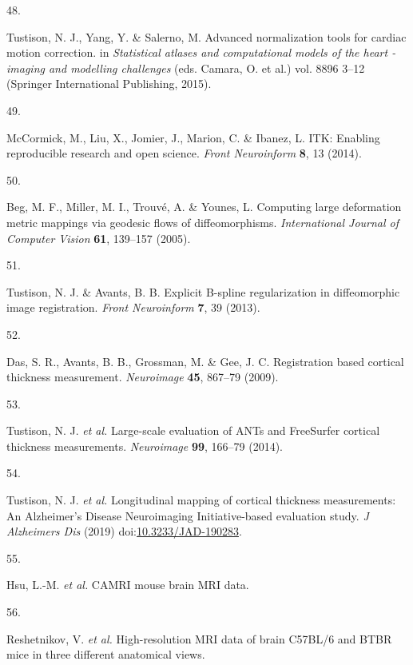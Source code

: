\documentclass[
  12pt,
]{article}
\newlength{\cslhangindent}
\newlength{\csllabelwidth}
\newenvironment{CSLReferences}[2] %
 {%
  \setlength{\parindent}{0pt}
  \ifodd #1 \everypar{\setlength{\hangindent}{\cslhangindent}}\ignorespaces\fi
  \ifnum #2 > 0
  \setlength{\parskip}{#2\baselineskip}
  \fi
 }%
 {}
\newcommand{\CSLLeftMargin}[1]{\parbox[t]{\csllabelwidth}{#1}}
\newcommand{\CSLRightInline}[1]{\parbox[t]{\linewidth - \csllabelwidth}{#1}\break}
\begin{document}
\begin{CSLReferences}{0}{0}
\leavevmode{}%
\CSLLeftMargin{48. }
\CSLRightInline{Tustison, N. J., Yang, Y. \& Salerno, M. Advanced
normalization tools for cardiac motion correction. in \emph{Statistical
atlases and computational models of the heart - imaging and modelling
challenges} (eds. Camara, O. et al.) vol. 8896 3--12 (Springer
International Publishing, 2015).}

\leavevmode{}%
\CSLLeftMargin{49. }
\CSLRightInline{McCormick, M., Liu, X., Jomier, J., Marion, C. \&
Ibanez, L. ITK: Enabling reproducible research and open science.
\emph{Front Neuroinform} \textbf{8}, 13 (2014).}

\leavevmode{}%
\CSLLeftMargin{50. }
\CSLRightInline{Beg, M. F., Miller, M. I., Trouvé, A. \& Younes, L.
Computing large deformation metric mappings via geodesic flows of
diffeomorphisms. \emph{International Journal of Computer Vision}
\textbf{61}, 139--157 (2005).}

\leavevmode{}%
\CSLLeftMargin{51. }
\CSLRightInline{Tustison, N. J. \& Avants, B. B. Explicit {B}-spline
regularization in diffeomorphic image registration. \emph{Front
Neuroinform} \textbf{7}, 39 (2013).}

\leavevmode{}%
\CSLLeftMargin{52. }
\CSLRightInline{Das, S. R., Avants, B. B., Grossman, M. \& Gee, J. C.
Registration based cortical thickness measurement. \emph{Neuroimage}
\textbf{45}, 867--79 (2009).}

\leavevmode{}%
\CSLLeftMargin{53. }
\CSLRightInline{Tustison, N. J. \emph{et al.} Large-scale evaluation of
{ANTs} and {FreeSurfer} cortical thickness measurements.
\emph{Neuroimage} \textbf{99}, 166--79 (2014).}

\leavevmode{}%
\CSLLeftMargin{54. }
\CSLRightInline{Tustison, N. J. \emph{et al.} Longitudinal mapping of
cortical thickness measurements: An {A}lzheimer's {D}isease
{N}euroimaging {I}nitiative-based evaluation study. \emph{J Alzheimers
Dis} (2019)
doi:\href{https://doi.org/10.3233/JAD-190283}{10.3233/JAD-190283}.}

\leavevmode{}%
\CSLLeftMargin{55. }
\CSLRightInline{Hsu, L.-M. \emph{et al.} CAMRI mouse brain MRI data.}

\leavevmode{}%
\CSLLeftMargin{56. }
\CSLRightInline{Reshetnikov, V. \emph{et al.} High-resolution MRI data
of brain C57BL/6 and BTBR mice in three different anatomical views.}


\end{CSLReferences}
\end{document}
